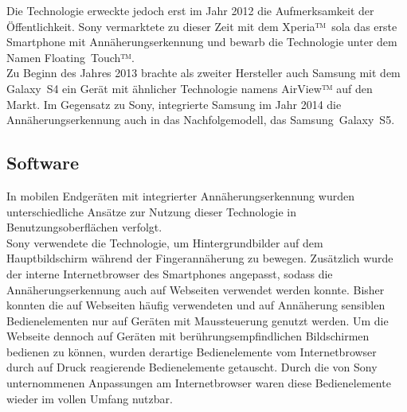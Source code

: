 \documentclass[12pt,numbers=noenddot,parskip,bibliography=totocnumbered,listof=totocnumbered]{scrreprt}
\begin{document}
Die Technologie erweckte jedoch erst im Jahr 2012 die Aufmerksamkeit der Öffentlichkeit. Sony vermarktete zu dieser Zeit mit dem \mbox{Xperia™ sola} das erste Smartphone mit Annäherungserkennung und bewarb die Technologie unter dem Namen \mbox{Floating Touch™}.\\
Zu Beginn des Jahres 2013 brachte als zweiter Hersteller auch Samsung mit dem \mbox{Galaxy S4} ein Gerät mit ähnlicher Technologie namens \mbox{AirView™} auf den Markt. Im Gegensatz zu Sony, integrierte Samsung im Jahr 2014 die Annäherungserkennung auch in das Nachfolgemodell, das \mbox{Samsung Galaxy S5}.

\subsection{Software}
In mobilen Endgeräten mit integrierter Annäherungserkennung wurden unterschiedliche Ansätze zur Nutzung dieser Technologie in Benutzungsoberflächen verfolgt.\\
Sony verwendete die Technologie, um Hintergrundbilder auf dem Hauptbildschirm während der Fingerannäherung zu bewegen. Zusätzlich wurde der interne Internetbrowser des Smartphones angepasst, sodass die Annäherungserkennung auch auf Webseiten verwendet werden konnte. Bisher konnten die auf Webseiten häufig verwendeten und auf Annäherung sensiblen Bedienelementen nur auf Geräten mit Maussteuerung genutzt werden. Um die Webseite dennoch auf Geräten mit berührungsempfindlichen Bildschirmen bedienen zu können, wurden derartige Bedienelemente vom Internetbrowser durch auf Druck reagierende Bedienelemente getauscht. Durch die von Sony unternommenen Anpassungen am Internetbrowser waren diese Bedienelemente wieder im vollen Umfang nutzbar.
\end{document}
